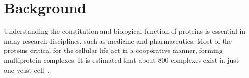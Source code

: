 \documentclass{bmcart}
\begin{document}
\begin{frontmatter}
\begin{abstractbox}

\begin{keyword}
\end{keyword}


\end{abstractbox}
%

\end{frontmatter}



\section*{Background}
Understanding the constitution and biological function of proteins is essential in many research disciplines, such as medicine and pharmaceutics.
Most of the proteins critical for the cellular life act in a cooperative manner, forming multiprotein complexes. 
It is estimated that about 800 complexes exist in just one yeast cell~\cite{Gavin}. 
\end{document}
